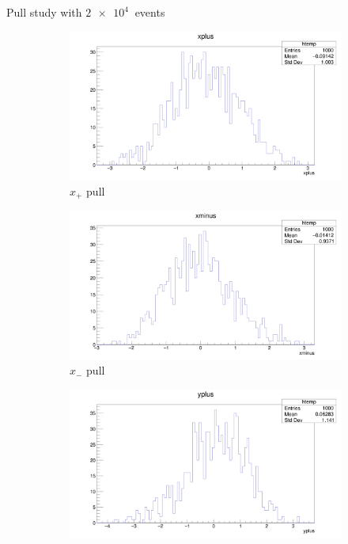 \documentclass{beamer}
\begin{document}
\begin{frame}{Pull study with $\SI{2e4}{}$ events}
  \begin{figure}
    \centering
    \vspace{-0.2cm}
    \begin{subfigure}{0.5\textwidth}
      \includegraphics[width = 1.0\textwidth]{xplus10K1K.png}
      \caption{$x_+$ pull}
    \end{subfigure}%
    \begin{subfigure}{0.5\textwidth}
      \includegraphics[width = 1.0\textwidth]{xminus10K1K.png}
      \caption{$x_-$ pull}
    \end{subfigure}
    \begin{subfigure}{0.5\textwidth}
      \includegraphics[width = 1.0\textwidth]{yplus10K1K.png}

\end{subfigure}
\end{figure}
\end{frame}
\end{document}
